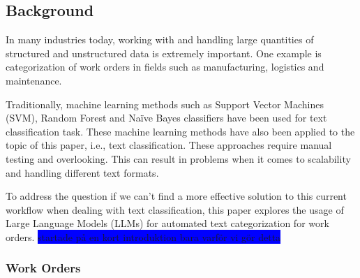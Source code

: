 \documentclass{article}
\begin{document}
\subsection{Background}








In many industries today, working with and handling large quantities of structured and unstructured data is extremely
important. One example is categorization of work orders in fields such as manufacturing, logistics and maintenance.
\bigskip

Traditionally, machine learning methods such as Support Vector Machines (SVM), Random Forest and Naïve Bayes classifiers
have been used for text classification task. These machine learning methods have also been applied to the topic of
this paper, i.e., text classification. These approaches require manual testing and overlooking. This can result in
problems when it comes to scalability and handling different text formats.
\bigskip

To address the question if we can't find a more effective solution to this current workflow when dealing with
text classification, this paper explores the usage of Large Language Models (LLMs) for automated text categorization
for work orders.
\colorbox{blue}{startade på en kort introduktion bara varför vi gör detta}

\subsubsection{Work Orders}
\end{document}
